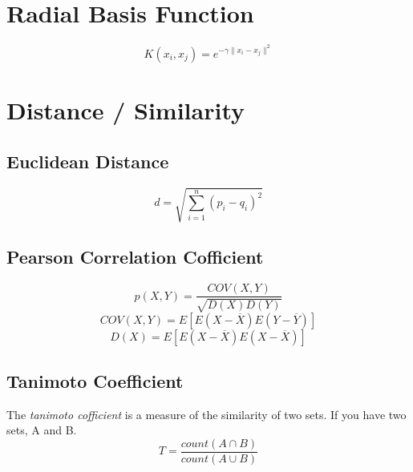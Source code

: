 \documentclass[twocolumn]{article}
\begin{document}
\section{Radial Basis Function}
\[
	K(x_i, x_j) = e^{-\gamma \|x_i - x_j \|^2}
\]

\section{Distance / Similarity}

\subsection{Euclidean Distance}
\[
	d = \sqrt{\sum_{i=1}^n (p_i - q_i)^2}
\]

\subsection{Pearson Correlation Cofficient}
\[
	p(X, Y) = \frac{COV(X, Y)}{\sqrt{D(X) D(Y)}}
\]
\[
	COV(X, Y) = E[E(X-\overline{X})E(Y-\overline{Y})]
\]
\[
	D(X) = E[E(X-\overline{X})E(X-\overline{X})]
\]

\subsection{Tanimoto Coefficient}
The \emph{tanimoto cofficient} is a measure of the similarity of two sets. If you have two sets, A and B. 
\[
	T = \frac{count(A \cap B)}{count(A \cup B)}
\]
\end{document}
